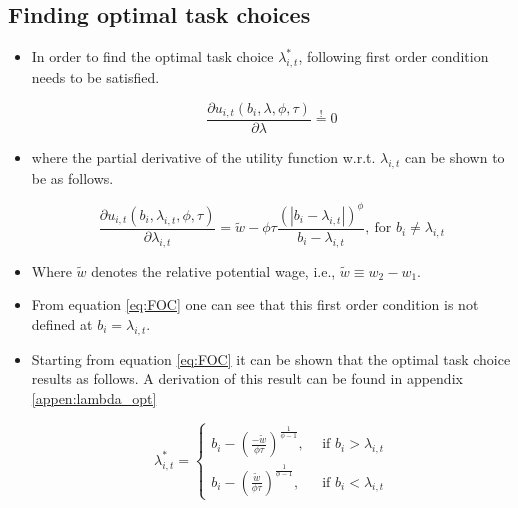 \documentclass{article}
\begin{document}
\subsection{Finding optimal task choices}\label{sec:FOC}

		\begin{itemize}
			\item{In order to find the optimal task choice $\lambda^*_{i, t}$, following first order condition needs to be satisfied.}

			\begin{equation}
				\frac{\partial u_{i,t}(b_i, \lambda, \phi, \tau)}{\partial \lambda} \overset{!}{=} 0
			\end{equation}
			\item[]{where the partial derivative of the utility function w.r.t. $\lambda_{i,t}$ can be shown to be as follows.}


			\begin{equation}\label{eq:FOC}
				\frac{\partial u_{i,t}(b_i, \lambda_{i,t}, \phi, \tau)}{\partial \lambda_{i,t}} = \tilde{w} - \phi \tau \frac{(|b_i - \lambda_{i,t}|)^\phi}{b_i - \lambda_{i,t}}, \: \text{for $b_i \neq \lambda_{i,t}$}
			\end{equation}
			\item{Where $\tilde{w}$ denotes the relative potential wage, i.e., $\tilde{w} \equiv w_2 - w_1$.}
			\item{From equation \ref{eq:FOC} one can see that this first order condition is not defined at $b_i = \lambda_{i,t}$.}
			\item{Starting from equation \ref{eq:FOC} it can be shown that the optimal task choice results as follows. A derivation of this result can be found in appendix \ref{appen:lambda_opt}}

			\begin{equation} \label{eq:lmb_opt}
				\lambda^*_{i,t} = \left\{
				\begin{array}{ll}
					b_i - (\frac{- \tilde{w}}{\phi \tau})^{\frac{1}{\phi -1}}, \: & \: \text{if $b_i > \lambda_{i,t}$}\\
					b_i - (\frac{\tilde{w}}{\phi \tau})^{\frac{1}{\phi - 1}}, \: & \: \text{if $b_i < \lambda_{i,t}$}
				\end{array}
			\right.
			\end{equation}


\end{itemize}
\end{document}
